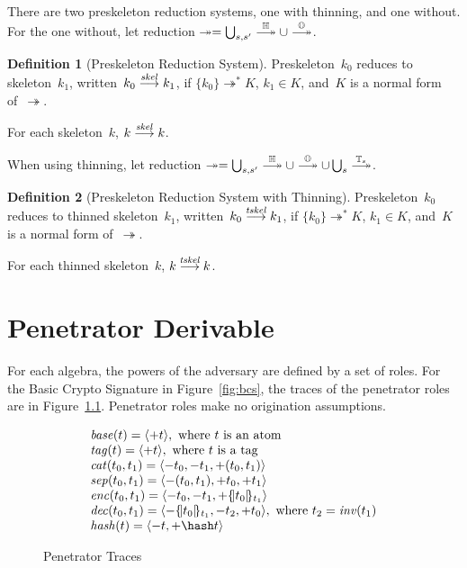 \documentclass[12pt]{report}
\theoremstyle{definition}
\newtheorem{defn}{Definition}[chapter]
\begin{document}
There are two preskeleton reduction systems, one with thinning, and one
without.  For the one without, let reduction $\twoheadrightarrow=
\bigcup_{s,s'}\setreduction{\ops{H}}\cup\setreduction{\ops{O}}$.

\begin{defn}[Preskeleton Reduction System]
Preskeleton~$k_0$ reduces to skeleton~$k_1$,
written~$k_0\stackrel{\operatorname{\mathit{skel}}}{\longrightarrow}k_1$, if
$\{k_0\}\twoheadrightarrow^\ast K$, $k_1\in K$, and~$K$ is a normal
form of~$\twoheadrightarrow$.
\end{defn}

For each skeleton~$k$, $k\stackrel{\operatorname{\mathit{skel}}}{\longrightarrow}k$.

When using thinning, let reduction $\twoheadrightarrow=
\bigcup_{s,s'}\setreduction{\ops{H}}\cup\setreduction{\ops{O}}\cup
\bigcup_s\setreduction{\ops{T}_s}$.

\begin{defn}[Preskeleton Reduction System with Thinning]
Preskeleton~$k_0$ reduces to thinned skeleton~$k_1$,
written~$k_0\stackrel{\operatorname{\mathit{tskel}}}{\longrightarrow}k_1$, if
$\{k_0\}\twoheadrightarrow^\ast K$, $k_1\in K$, and~$K$ is a normal
form of~$\twoheadrightarrow$.
\end{defn}

For each thinned skeleton~$k$, $k\stackrel{\operatorname{\mathit{tskel}}}{\longrightarrow}k$.

\chapter{Penetrator Derivable}\label{chp:penetrator derivable}

For each algebra, the powers of the adversary are defined by a set of
roles.  For the Basic Crypto Signature in Figure~\ref{fig:bcs}, the
traces of the penetrator roles are in Figure~\ref{fig:pen traces}.
Penetrator roles make no origination assumptions.

\begin{figure}
$$\begin{array}{l}
\fn{base}(t)=\seq{\outbnd t},\mbox{ where $t$ is an atom}\\
\fn{tag}(t)=\seq{\outbnd t},\mbox{ where $t$ is a tag}\\
\fn{cat}(t_0,t_1)=\seq{\inbnd t_0,\inbnd t_1, \outbnd(t_0,
  t_1)}\\
\fn{sep}(t_0,t_1)=\seq{\inbnd(t_0, t_1),\outbnd
    t_0,\outbnd t_1}\\
\fn{enc}(t_0,t_1)=\seq{\inbnd t_0,\inbnd t_1,
\outbnd\enc{t_0}{t_1}}\\
\fn{dec}(t_0,t_1)=\seq{\inbnd\enc{t_0}{t_1},
\inbnd t_2,\outbnd t_0},\mbox{ where $t_2=\fn{inv}(t_1)$}\\
\fn{hash}(t)=\seq{\inbnd t,\outbnd\hash t}
\end{array}$$
\caption{Penetrator Traces}\label{fig:pen traces}
\end{figure}
\end{document}
